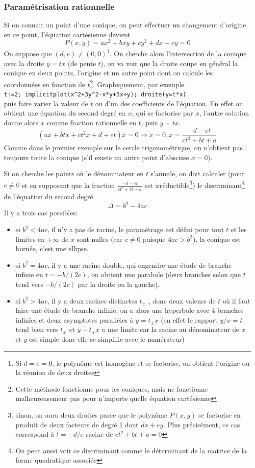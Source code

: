 \documentclass[a4paper,11pt]{article}
\begin{document}
\subsubsection{Param\'etrisation rationnelle}
Si on connait un point d'une conique, on peut effectuer
un changement d'origine en ce point, l'\'equation cart\'esienne
devient
$$P(x,y)=ax^2+bxy+cy^2+dx+ey=0$$
On suppose que $(d,e)\neq(0,0)$\footnote{Si $d=e=0$, le
polyn\^ome est homog\`ene et se factorise,
on obtient l'origine ou la r\'eunion de deux droites}.
On cherche alors l'intersection de la conique avec la droite $y=tx$
(de pente $t$), on va voir que la droite coupe en g\'en\'eral la
conique en deux points, l'origine et un autre point dont on
calcule les coordonn\'ees en fonction de $t$\footnote{Cette m\'ethode
fonctionne pour les coniques, mais ne fonctionne malheureusement
pas pour n'importe quelle \'equation cart\'esienne}.
Graphiquement, par exemple\\
\verb|t:=2; implicitplot(x^2+3y^2-x*y+3x+y); droite(y=t*x)|\\
puis faire varier la valeur de $t$ ou d'un des coefficients de l'\'equation.
En effet on obtient une \'equation du second degr\'e en $x$,
qui se factorise par $x$, l'autre solution donne alors $x$ comme
fraction rationnelle en $t$, puis $y=tx$.
$$ (ax+btx+ct^2x+d+et)x=0 \Rightarrow x=0, x=\frac{-d-et}{ct^2+bt+a}$$
Comme dans le premier exemple sur le cercle trigonom\'etrique,
on n'obtient pas toujours toute la conique (s'il existe un autre
point d'abscisse $x=0$).

Si on cherche les points o\`u le d\'enominateur en $t$ s'annule, on doit
calculer  (pour $c\neq 0$ et en supposant que la fraction
$\frac{-d-et}{ct^2+bt+a}$ est irr\'eductible\footnote{sinon, on 
aura deux droites parce que le
polyn\^ome $P(x,y)$ se factorise en produit de deux facteurs
de degr\'e 1 dont $dx+ey$. Plus pr\'ecis\'ement, ce cas
correspond \`a $t=-d/e$ racine de $ct^2+bt+a=0$})
le discriminant\footnote{On peut aussi voir ce discriminant comme le
d\'eterminant de la matrice de la forme quadratique associ\'ee} 
de l'\'equation du second degr\'e
$$ \Delta= b^2-4ac$$
Il y a trois cas possibles: 
\begin{itemize}
\item si $b^2<4ac$, il n'y a pas de racine, le
param\'etrage est d\'efini pour tout $t$ et les limites en $\pm
\infty$ de $x$ sont nulles (car $c \neq 0$ puisque $4ac>b^2$),
la conique est born\'ee, c'est une ellipse.
\item si $b^2=4ac$, il y a une racine double, qui engendre
une \'etude de branche infinie en $t=-b/(2c)$, on
obtient une parabole (deux branches selon que $t$ tend
vers $-b/(2c)$ par la droite ou la gauche).
\item si $b^2>4ac$, il y a deux racines distinctes $t_\pm$ , 
donc deux valeurs de $t$ o\`u il faut faire une \'etude
de branche infinie, on a alors une
hyperbole
avec 4 branches infinies et deux asymptotes parall\`eles \`a
$y=t_\pm x$ (en effet le rapport $y/x=t$ tend bien
vers $t_\pm$ et $y-t_\pm x$ a une limite car la racine au
d\'enominateur de $x$ et $y$ est simple 
donc elle se simplifie avec le num\'erateur)
\end{itemize}
 
\end{document}
